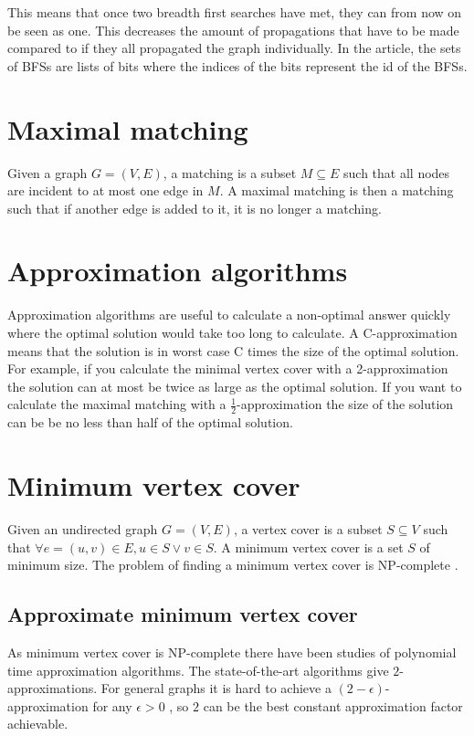 This means that once two breadth first searches have met, they can from now on be seen as one. This decreases the amount of propagations that have to be made compared to if they all propagated the graph individually. In the article, the sets of BFSs are lists of bits where the indices of the bits represent the id of the BFSs.

\section{Maximal matching}
Given a graph $G = (V,E)$, a matching is a subset $M \subseteq E$ such that all nodes are incident to at most one edge in $M$. A maximal matching is then a matching such that if another edge is added to it, it is no longer a matching. 

\section{Approximation algorithms}
Approximation algorithms are useful to calculate a non-optimal answer quickly where the optimal solution would take too long to calculate. A C-approximation means that the solution is in worst case C times the size of the optimal solution. For example, if you calculate the minimal vertex cover with a 2-approximation the solution can at most be twice as large as the optimal solution. If you want to calculate the maximal matching with a $\frac{1}{2}$-approximation the size of the solution can be be no less than half of the optimal solution.

\section{Minimum vertex cover}
Given an undirected graph $G = (V,E)$, a vertex cover is a subset $S \subseteq V$ such that $\forall e = (u,v) \in E,  u \in S \vee v \in S$. A minimum vertex cover is a set $S$ of minimum size. The problem of finding a minimum vertex cover is NP-complete \cite{Kar72}.

\subsection{Approximate minimum vertex cover}
As minimum vertex cover is NP-complete there have been studies of polynomial time approximation algorithms. The state-of-the-art algorithms give $2$-approximations. For general graphs it is hard to achieve a $(2-\epsilon)$-approximation for any $\epsilon > 0$ \cite{2-evchard}, so $2$ can be the best constant approximation factor achievable.

